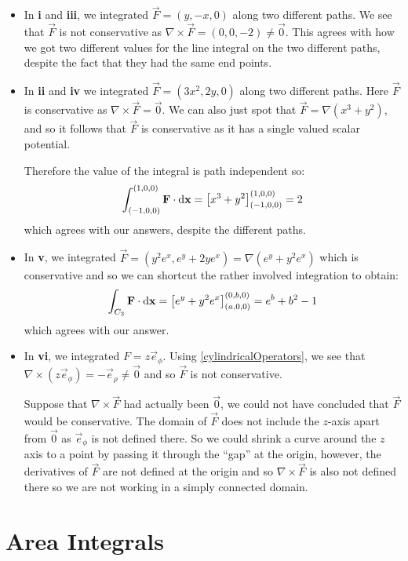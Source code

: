 \documentclass[../main.tex]{subfiles}
\begin{document}
\begin{example}
  \begin{itemize}
    \item In \textbf{i} and \textbf{iii}, we integrated $\vec{F} = (y, -x, 0)$ along two different paths.
      We see that $\vec{F}$ is not conservative as $\nabla \times \vec{F} = (0, 0, -2) \neq \vec{0}$.
      This agrees with how we got two different values for the line integral on the two different paths, despite the fact that they had the same end points.
    \item In \textbf{ii} and \textbf{iv} we integrated $\vec{F} = (3x^2, 2y, 0)$ along two different paths.
      Here $\vec{F}$ is conservative as $\nabla \times \vec{F} = \vec{0}$.
      We can also just spot that $\vec{F} = \nabla (x^3 + y^2)$, and so it follows that $\vec{F}$ is conservative as it has a single valued scalar potential.

      Therefore the value of the integral is path independent so:
      \[
        \int_{(-1, 0, 0)}^{(1, 0, 0)} \vec{F} \cdot \d{\vec{x}} = \eval{x^3 + y^2}{(-1, 0, 0)}{(1, 0, 0)} = 2
      \]
      which agrees with our answers, despite the different paths.
    \item In \textbf{v}, we integrated $\vec{F} = (y^2 e^{x}, e^{y} + 2ye^{x}) = \nabla(e^{y} + y^2e^{x})$ which is conservative and so we can shortcut the rather involved integration to obtain:
      \[
        \int_{C_3} \vec{F} \cdot \d{\vec{x}} = \eval{e^{y} + y^2e^{x}}{(a, 0, 0)}{(0, b, 0)} = e^{b} + b^2 - 1
      \]
      which agrees with our answer.
    \item In \textbf{vi}, we integrated $F = z \vec{e}_\phi$.
      Using \cref{cylindricalOperators}, we see that $\nabla \times (z \vec{e}_\phi) = -\vec{e}_\rho \neq \vec{0}$ and so $\vec{F}$ is not conservative.

      Suppose that $\nabla \times \vec{F}$ had actually been $\vec{0}$, we could not have concluded that $\vec{F}$ would be conservative.
      The domain of $\vec{F}$ does not include the $z$-axis apart from $\vec{0}$ as $\vec{e}_\phi$ is not defined there.
      So we could shrink a curve around the $z$ axis to a point by passing it through the ``gap'' at the origin, however, the derivatives of $\vec{F}$ are not defined at the origin and so $\nabla \times \vec{F}$ is also not defined there so we are not working in a simply connected domain.
  \end{itemize}
\end{example}
\section{Area Integrals}
\label{areaIntegrals}
\end{document}
